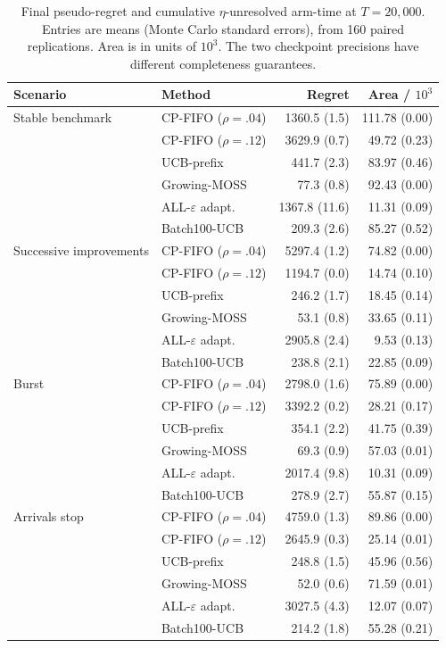 \begin{table}[t]
\centering
\caption{Final pseudo-regret and cumulative $\eta$-unresolved arm-time at $T=20{,}000$. Entries are means (Monte Carlo standard errors), from 160 paired replications. Area is in units of $10^3$. The two checkpoint precisions have different completeness guarantees.}
\label{tab:simulation}
\small
\begin{tabular}{llrr}
\toprule
Scenario & Method & Regret & Area / $10^3$ \\
\midrule
Stable benchmark & CP-FIFO ($\rho=.04$) & 1360.5 (1.5) & 111.78 (0.00) \\
 & CP-FIFO ($\rho=.12$) & 3629.9 (0.7) & 49.72 (0.23) \\
 & UCB-prefix & 441.7 (2.3) & 83.97 (0.46) \\
 & Growing-MOSS & 77.3 (0.8) & 92.43 (0.00) \\
 & ALL-$\varepsilon$ adapt. & 1367.8 (11.6) & 11.31 (0.09) \\
 & Batch100-UCB & 209.3 (2.6) & 85.27 (0.52) \\
\midrule
Successive improvements & CP-FIFO ($\rho=.04$) & 5297.4 (1.2) & 74.82 (0.00) \\
 & CP-FIFO ($\rho=.12$) & 1194.7 (0.0) & 14.74 (0.10) \\
 & UCB-prefix & 246.2 (1.7) & 18.45 (0.14) \\
 & Growing-MOSS & 53.1 (0.8) & 33.65 (0.11) \\
 & ALL-$\varepsilon$ adapt. & 2905.8 (2.4) & 9.53 (0.13) \\
 & Batch100-UCB & 238.8 (2.1) & 22.85 (0.09) \\
\midrule
Burst & CP-FIFO ($\rho=.04$) & 2798.0 (1.6) & 75.89 (0.00) \\
 & CP-FIFO ($\rho=.12$) & 3392.2 (0.2) & 28.21 (0.17) \\
 & UCB-prefix & 354.1 (2.2) & 41.75 (0.39) \\
 & Growing-MOSS & 69.3 (0.9) & 57.03 (0.01) \\
 & ALL-$\varepsilon$ adapt. & 2017.4 (9.8) & 10.31 (0.09) \\
 & Batch100-UCB & 278.9 (2.7) & 55.87 (0.15) \\
\midrule
Arrivals stop & CP-FIFO ($\rho=.04$) & 4759.0 (1.3) & 89.86 (0.00) \\
 & CP-FIFO ($\rho=.12$) & 2645.9 (0.3) & 25.14 (0.01) \\
 & UCB-prefix & 248.8 (1.5) & 45.96 (0.56) \\
 & Growing-MOSS & 52.0 (0.6) & 71.59 (0.01) \\
 & ALL-$\varepsilon$ adapt. & 3027.5 (4.3) & 12.07 (0.07) \\
 & Batch100-UCB & 214.2 (1.8) & 55.28 (0.21) \\
\bottomrule
\end{tabular}
\end{table}
